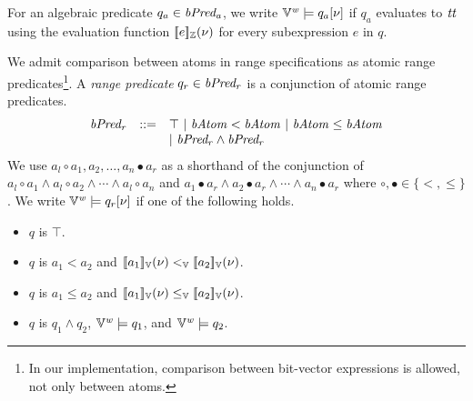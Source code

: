 For an algebraic predicate $q_a \in \mathit{bPred_a}$, we write $\mathbb{V}^{\mathit{w}} \models q_a[\nu]$ if $q_a$ evaluates to $\mathit{tt}$ using the evaluation function $[\![{e}]\!]_{\mathbb{Z}}(\nu)$ for every subexpression $e$ in $q$.

We admit comparison between atoms in range specifications as atomic range predicates\footnote{In our implementation, comparison between bit-vector expressions is allowed, not only between atoms.}.
A \emph{range predicate} $q_r \in \mathit{bPred_r}$ is a conjunction of atomic range predicates.
\[
\begin{array}{rcl}
  \mathit{bPred_r} & ::= & \top \ |\ \mathit{bAtom} < \mathit{bAtom} \ |\ \mathit{bAtom} \leq \mathit{bAtom} \\
           &     & |\ \mathit{bPred_r} \wedge \mathit{bPred_r} \\
\end{array}
\]
We use $a_l \circ a_1, a_2, \ldots, a_n \bullet a_r$ as a shorthand of the conjunction of $a_l \circ a_1 \wedge a_l \circ a_2 \wedge \cdots \wedge a_l \circ a_n$ and $a_1 \bullet a_r \wedge a_2 \bullet a_r \wedge \cdots \wedge a_n \bullet a_r$ where $\circ, \bullet \in \{<, \leq\}$.
We write $\mathbb{V}^{\mathit{w}} \models q_r[\nu]$ if one of the following holds.
\begin{itemize}
  \item $q$ is $\top$.
  \item $q$ is $a_1 < a_2$ and $[\![{a_1}]\!]_{\mathbb{V}}(\nu) <_{\mathbb{V}} [\![{a_2}]\!]_{\mathbb{V}}(\nu)$.
  \item $q$ is $a_1 \leq a_2$ and $[\![{a_1}]\!]_{\mathbb{V}}(\nu) \leq_{\mathbb{V}} [\![{a_2}]\!]_{\mathbb{V}}(\nu)$.
  \item $q$ is $q_1 \wedge q_2$, $\mathbb{V}^{\mathit{w}} \models q_1$, and $\mathbb{V}^{\mathit{w}} \models q_2$.
\end{itemize}

